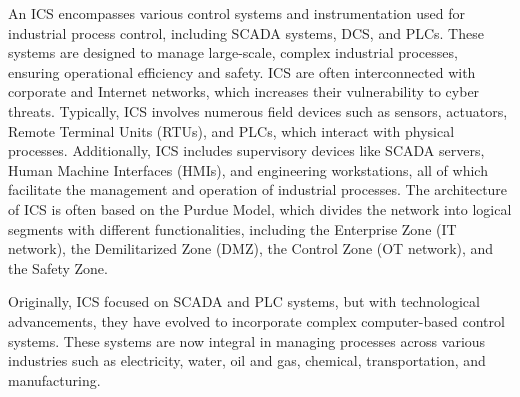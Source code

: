An ICS encompasses various control systems and instrumentation used for industrial process control, including SCADA systems, DCS, and PLCs. These systems are designed to manage large-scale, complex industrial processes, ensuring operational efficiency and safety. ICS are often interconnected with corporate and Internet networks, which increases their vulnerability to cyber threats\cite{8,157,158,159}. Typically, ICS involves numerous field devices such as sensors, actuators, Remote Terminal Units (RTUs), and PLCs, which interact with physical processes. Additionally, ICS includes supervisory devices like SCADA servers, Human Machine Interfaces (HMIs), and engineering workstations, all of which facilitate the management and operation of industrial processes\cite{9,160}. The architecture of ICS is often based on the Purdue Model, which divides the network into logical segments with different functionalities, including the Enterprise Zone (IT network), the Demilitarized Zone (DMZ), the Control Zone (OT network), and the Safety Zone\cite{10,161}.

Originally, ICS focused on SCADA and PLC systems, but with technological advancements, they have evolved to incorporate complex computer-based control systems. These systems are now integral in managing processes across various industries such as electricity, water, oil and gas, chemical, transportation, and manufacturing\cite{11,162}.

